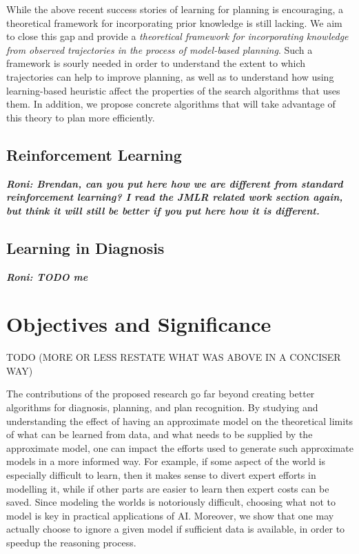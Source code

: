 \documentclass[12pt]{article}
\newcommand{\note}[1]{\textbf{\textit{#1}}}
\begin{document}
While the above recent success stories of learning for planning is encouraging, a theoretical framework for incorporating prior knowledge is still lacking. We aim to close this gap and provide a {\em theoretical framework for incorporating knowledge from observed trajectories in the process of model-based planning}. Such a framework is sourly needed in order to understand the extent to which trajectories can help to improve planning, as well as to understand how using learning-based heuristic affect the properties of the search algorithms that uses them. In addition, we propose concrete algorithms that will take advantage of this theory to plan more efficiently. 


\subsection{Reinforcement Learning}
\note{Roni: Brendan, can you put here how we are different from standard reinforcement learning? 
I read the JMLR related work section again, but think it will still be better if you put here
how it is different.}


\subsection{Learning in Diagnosis}
\note{Roni: TODO me}

\section{Objectives and Significance}

TODO (MORE OR LESS RESTATE WHAT WAS ABOVE IN A CONCISER WAY)




The contributions of the proposed research go far beyond creating better algorithms for diagnosis, planning, and plan recognition.  By studying and understanding the effect of having an approximate model on the theoretical limits of what can be learned from data, 
and what needs to be supplied by the approximate model, one can impact the efforts used to generate such approximate models in a more informed way. For example, if some aspect of the world is especially difficult to learn, then it makes sense to divert expert efforts in modelling it, while if other parts are easier to learn then expert costs can be saved. Since modeling the worlds is notoriously difficult, choosing what not to model is key in practical applications of AI. 
Moreover, we show that one may actually choose to ignore a given model 
if sufficient data is available, in order to speedup the reasoning process. 
\end{document}
